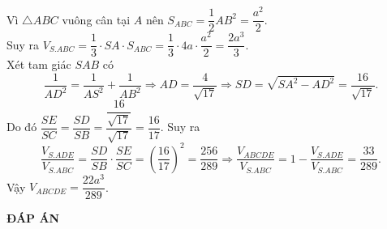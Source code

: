 \begin{ex}
{\begin{center}
\end{center}
Vì $\bigtriangleup ABC$ vuông cân tại $A$ nên $S_{ABC}=\dfrac{1}{2}AB^2=\dfrac{a^2}{2}$.\\
Suy ra $V_{S.ABC}=\dfrac{1}{3}\cdot SA\cdot S_{ABC}= \dfrac{1}{3}\cdot 4a\cdot \dfrac{a^2}{2}=\dfrac{2a^3}{3}$.\\
Xét tam giác $SAB$ có $$\dfrac{1}{AD^2}=\dfrac{1}{AS^2}+\dfrac{1}{AB^2} \Rightarrow AD=\dfrac{4}{\sqrt{17}} \Rightarrow SD=\sqrt{SA^2-AD^2}=\dfrac{16}{\sqrt{17}}.$$
Do đó $\dfrac{SE}{SC}=\dfrac{SD}{SB}=\dfrac{\dfrac{16}{\sqrt{17}}}{\sqrt{17}}=\dfrac{16}{17}$. Suy ra
$$\dfrac{V_{S.ADE}}{V_{S.ABC}}=\dfrac{SD}{SB}\cdot \dfrac{SE}{SC}=\left(\dfrac{16}{17}\right)^2=\dfrac{256}{289} \Rightarrow \dfrac{V_{ABCDE}}{V_{S.ABC}}=1-\dfrac{V_{S.ADE}}{V_{S.ABC}}=\dfrac{33}{289}.$$
Vậy $V_{ABCDE}=\dfrac{22a^3}{289}$.
}
\end{ex}
\newpage
\begin{center}
	\textbf{ĐÁP ÁN}
\end{center}
\begin{multicols}{10}
	 
\end{multicols}
